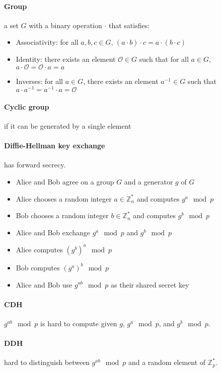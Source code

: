 \documentclass[11pt]{article}
\begin{document}
\paragraph{Group} a set $G$ with a binary operation $\cdot$ that satisfies:
\begin{itemize}
  \item Associativity: for all $a, b, c \in G$, $(a \cdot b) \cdot c = a \cdot (b \cdot c)$
  \item Identity: there exists an element $\mathcal{O} \in G$ such that for all $a \in G$, $a \cdot \mathcal{O} = \mathcal{O} \cdot a = a$
  \item Inverses: for all $a \in G$, there exists an element $a^{-1} \in G$ such that $a \cdot a^{-1} = a^{-1} \cdot a = \mathcal{O}$
\end{itemize}

\paragraph{Cyclic group} if it can be generated by a single element

\paragraph{Diffie-Hellman key exchange} has forward secrecy.

\begin{itemize}
  \item Alice and Bob agree on a group $G$ and a generator $g$ of $G$
  \item Alice chooses a random integer $a \in \mathbb{Z}_n^*$ and computes $g^a \mod p$
  \item Bob chooses a random integer $b \in \mathbb{Z}_n^*$ and computes $g^b \mod p$
  \item Alice and Bob exchange $g^a \mod p$ and $g^b \mod p$
  \item Alice computes $(g^b)^a \mod p$
  \item Bob computes $(g^a)^b \mod p$
  \item Alice and Bob use $g^{ab} \mod p$ as their shared secret key
\end{itemize}

\paragraph{CDH} $g^{ab} \mod p$ is hard to compute given $g$, $g^a \mod p$, and $g^b \mod p$.

\paragraph{DDH} hard to distinguish between $g^{ab} \mod p$ and a random element of $\mathbb{Z}_p^*$.
\end{document}
